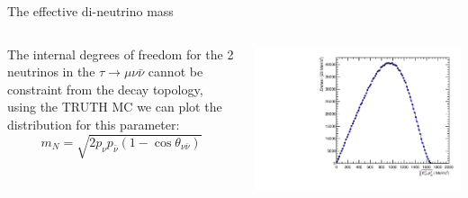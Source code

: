 \documentclass[9pt,usenames,dvipsnames]{beamer}
\begin{document}
%
\begin{frame}{The effective di-neutrino mass }
	\begin{columns}[c]
	The internal degrees of freedom for the 2 neutrinos in the $ \tau \to \mu \nu \bar \nu$ cannot be constraint from the decay topology, using the TRUTH MC we can plot the distribution for this parameter:
		\begin{equation}
		m_N = \sqrt{2p_{\nu} p_{\bar \nu}(1- \cos \theta_{\nu \bar \nu})}\nonumber
		\label{MN}
		\end{equation}
		\begin{center}
			\includegraphics[width= \textwidth]{./assets/can_meff_3pimu_FullTRUE_0.pdf} 
		\end{center}
	\end{columns}
\end{frame}
\end{document}
